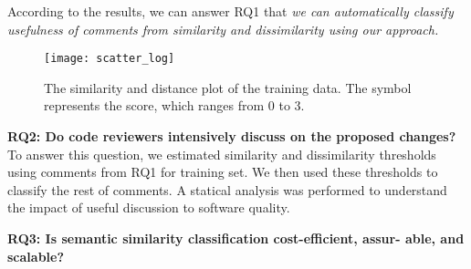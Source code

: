 According to the results, we can answer  RQ1 that \textit{we can automatically classify usefulness of comments from similarity and dissimilarity using our approach.}



\begin{figure}[!t]
\centering
\texttt{[image: scatter\_log]}
\caption{The similarity and distance plot of the training data.
The symbol represents the score, which ranges from 0 to 3.}
\label{fig:scatter}
\end{figure}

\noindent \textbf{RQ2: Do code reviewers intensively discuss on the proposed changes?}\\
\indent To answer this question, we estimated similarity and dissimilarity thresholds using comments from RQ1 for training set. We then used these thresholds to classify the rest of comments. A statical analysis was performed to understand the impact of useful discussion to software quality.


\noindent \textbf{RQ3: Is semantic similarity classification cost-efficient, assur- able, and scalable?}\\



